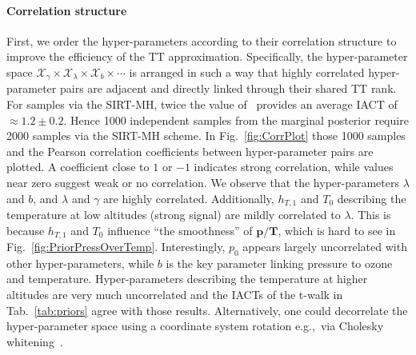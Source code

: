 \paragraph{Correlation structure}
First, we order the hyper-parameters according to their correlation structure to improve the efficiency of the TT approximation. 
Specifically, the hyper-parameter space $\mathcal{X}_{\gamma} \times \mathcal{X}_{\lambda} \times \mathcal{X}_{b} \times \cdots$ is arranged in such a way that highly correlated hyper-parameter pairs are adjacent and directly linked through their shared TT rank.
For samples via the SIRT-MH, twice the value of~\cite{wolff2004monte, drikHesse} provides an average IACT of $\approx 1.2 \pm 0.2$.
Hence 1000 independent samples from the marginal posterior require 2000 samples via the SIRT-MH scheme.
In Fig.~\ref{fig:CorrPlot} those 1000 samples and the Pearson correlation coefficients between hyper-parameter pairs are plotted.
A coefficient close to $1$ or $-1$ indicates strong correlation, while values near zero suggest weak or no correlation.
We observe that the hyper-parameters $\lambda$ and $b$, and $\lambda$ and $\gamma$ are highly correlated.
Additionally, $h_{T,1}$ and $T_0$ describing the temperature at low altitudes (strong signal) are mildly correlated to $\lambda$.
This is because $h_{T,1}$ and $T_0$ influence ``the smoothness'' of $\bm{p}/\bm{T}$, which is hard to see in Fig.~\ref{fig:PriorPressOverTemp}.
Interestingly, $p_0$ appears largely uncorrelated with other hyper-parameters, while $b$ is the key parameter linking pressure to ozone and temperature.
Hyper-parameters describing the temperature at higher altitudes are very much uncorrelated and the IACTs of the t-walk in Tab.~\ref{tab:priors} agree with those results.
Alternatively, one could decorrelate the hyper-parameter space using a coordinate system rotation e.g.,~via Cholesky whitening~\cite{KessyWhitening2018}.
\clearpage

